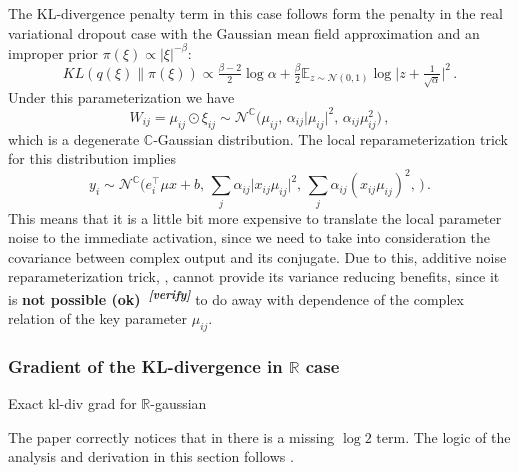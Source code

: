 \documentclass[a4paper,10pt]{article}
\newcommand{\attn}[2]{\textbf{\color{red} #2~\textsuperscript{\textit{[#1]}}}}
\newcommand{\verify}[1]{\attn{verify}{#1}}
\newcommand{\real}{\mathbb{R}}
\newcommand{\cplx}{\mathbb{C}}
\begin{document}
The KL-divergence penalty term in this case follows form the penalty in the real variational
dropout case with the Gaussian mean field approximation and an improper prior $
  \pi(\xi)\propto \lvert \xi \rvert^{-\beta}
$:
$$
KL(q(\xi)\| \pi(\xi))
  \propto \tfrac{\beta-2}2 \log \alpha
    + \tfrac\beta2 \mathbb{E}_{z\sim \mathcal{N}(0, 1)}
      \log \lvert z + \tfrac1{\sqrt{\alpha}} \rvert^2
  \,. $$
Under this parameterization we have
$$
W_{ij} = \mu_{ij} \odot \xi_{ij}
  \sim \mathcal{N}^{\cplx} \bigl(
    \mu_{ij},
    \, \alpha_{ij} \lvert \mu_{ij} \rvert^2,
    \, \alpha_{ij} \mu_{ij}^2
  \bigr)
  \,, $$
which is a degenerate $\cplx$-Gaussian distribution. The local reparameterization trick for
this distribution implies
$$
y_i
  \sim \mathcal{N}^{\cplx}\bigl(
    e_i^\top \mu x + b,
    \, \sum_j \alpha_{ij} \lvert x_{ij} \mu_{ij}\rvert^2,
    \, \sum_j \alpha_{ij} (x_{ij} \mu_{ij})^2,
    \,
  \bigr)
  \,. $$
This means that it is a little bit more expensive to translate the local parameter noise
to the immediate activation, since we need to take into consideration the covariance between
complex output and its conjugate. Due to this, additive noise reparameterization trick,
\cite{molchanov_variational_2017}, cannot provide its variance reducing benefits, since
it is \verify{not possible (ok)} to do away with dependence of the complex relation of the
key parameter $\mu_{ij}$.



\subsubsection{Gradient of the KL-divergence in $\real$ case} %
\label{ssub:gradient_of_the_kl_divergence_in_R_case}

Exact kl-div grad for $\mathbb{R}$-gaussian

The paper \cite{pav_moments_2015} correctly notices that in \cite[p. 2466]{lapidoth_capacity_2003}
there is a missing $\log{2}$ term. The logic of the analysis and derivation in this section
follows \cite{lapidoth_capacity_2003}.
\end{document}
